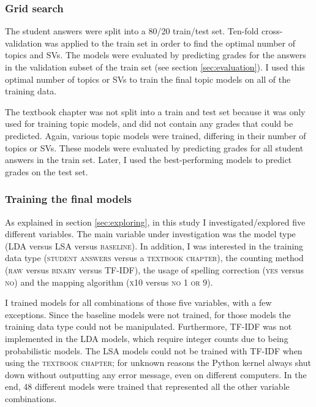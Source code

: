 \documentclass[a4paper,10pt,twoside]{article}
\begin{document}
\subsubsection{Grid search}
\label{sec:gridsearch}
The student answers were split into a 80/20 train/test set. Ten-fold cross-validation was applied to the train set in order to find the optimal number of topics and SVs. The models were evaluated by predicting grades for the answers in the validation subset of the train set (see section \ref{sec:evaluation}). I used this optimal number of topics or SVs to train the final topic models on all of the training data.

The textbook chapter was not split into a train and test set because it was only used for training topic models, and did not contain any grades that could be predicted. Again, various topic models were trained, differing in their number of topics or SVs. These models were evaluated by predicting grades for all student answers in the train set. Later, I used the best-performing models to predict grades on the test set.

\subsubsection{Training the final models}
\label{sec:training}
As explained in section \ref{sec:exploring}, in this study I investigated/explored five different variables. The main variable under investigation was the model type (LDA versus LSA versus \textsc{baseline}). In addition, I was interested in the training data type (\textsc{student answers} versus a \textsc{textbook chapter}), the counting method (\textsc{raw} versus \textsc{binary} versus TF-IDF), the usage of spelling correction (\textsc{yes} versus \textsc{no}) and the mapping algorithm (\textsc{x10} versus \textsc{no 1 or 9}).

I trained models for all combinations of those five variables, with a few exceptions. Since the baseline models were not trained, for those models the training data type could not be manipulated. Furthermore, TF-IDF was not implemented in the LDA models, which require integer counts due to being probabilistic models. The LSA models could not be trained with TF-IDF when using the \textsc{textbook chapter}; for unknown reasons the Python kernel always shut down without outputting any error message, even on different computers. In the end, 48 different models were trained that represented all the other variable combinations.
\end{document}
